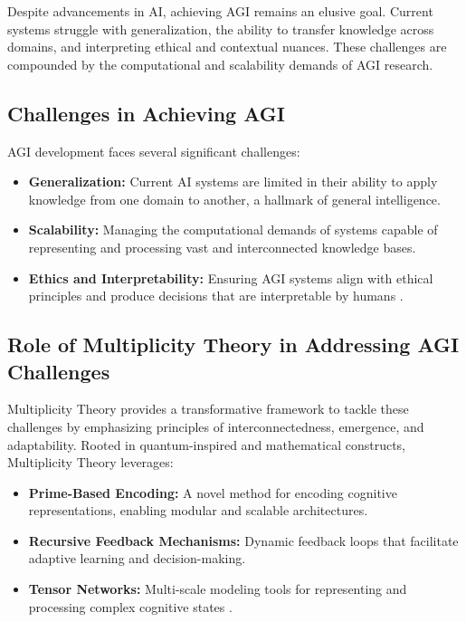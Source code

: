 \documentclass{article}
\theoremstyle{plain}
\begin{document}
Despite advancements in AI, achieving AGI remains an elusive goal. Current systems struggle with generalization, the ability to transfer knowledge across domains, and interpreting ethical and contextual nuances. These challenges are compounded by the computational and scalability demands of AGI research.

\subsection{Challenges in Achieving AGI}
AGI development faces several significant challenges:
\begin{itemize}
    \item \textbf{Generalization:} Current AI systems are limited in their ability to apply knowledge from one domain to another, a hallmark of general intelligence.
    \item \textbf{Scalability:} Managing the computational demands of systems capable of representing and processing vast and interconnected knowledge bases.
    \item \textbf{Ethics and Interpretability:} Ensuring AGI systems align with ethical principles and produce decisions that are interpretable by humans \cite{russell2019humancompatible}.
\end{itemize}

\subsection{Role of Multiplicity Theory in Addressing AGI Challenges}
Multiplicity Theory provides a transformative framework to tackle these challenges by emphasizing principles of interconnectedness, emergence, and adaptability. Rooted in quantum-inspired and mathematical constructs, Multiplicity Theory leverages:
\begin{itemize}
    \item \textbf{Prime-Based Encoding:} A novel method for encoding cognitive representations, enabling modular and scalable architectures.
    \item \textbf{Recursive Feedback Mechanisms:} Dynamic feedback loops that facilitate adaptive learning and decision-making.
    \item \textbf{Tensor Networks:} Multi-scale modeling tools for representing and processing complex cognitive states \cite{biamonte2017tensor}.
\end{itemize}
\end{document}
